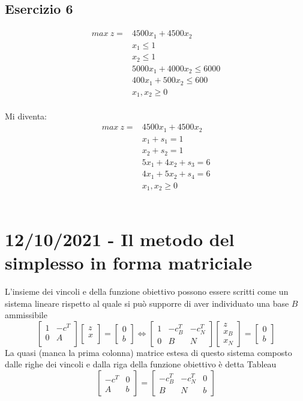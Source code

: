 \documentclass[12pt,a4paper]{article}
\begin{document}
 \subsection{Esercizio 6}
$$\begin{array}{cl}
max \ z = & 4500x_1+4500x_2\\
 & x_1 \leq 1\\
 & x_2 \leq 1\\
 & 5000x_1+4000x_2 \leq 6000\\
 & 400x_1+500x_2 \leq 600\\
 & x_1,x_2 \geq 0
 \end{array}$$\\
 Mi diventa: $$\begin{array}{cl}
max \ z = & 4500x_1+4500x_2\\
 & x_1 + s_1= 1\\
 & x_2 + s_2 = 1\\
 & 5x_1+4x_2 + s_3 = 6\\
 & 4x_1+5x_2 + s_4 = 6\\
 & x_1,x_2 \geq 0
 \end{array}$$\\
 
 \clearpage
 \section{12/10/2021 - Il metodo del simplesso in forma matriciale}
 L'insieme dei vincoli e della funzione obiettivo possono essere scritti come un sistema lineare rispetto al quale si può supporre di aver individuato una base $B$ ammissibile
 $$\left[\begin{array}{cc}1 & -c^T\\0 & A\\\end{array}\right]\left[\begin{array}{c}z\\x\\\end{array}\right] = \left[\begin{array}{c}0\\b\end{array}\right] \Leftrightarrow \left[\begin{array}{ccc}1&-c_B^T & -c_N^T\\0&B&N\end{array}\right]\left[\begin{array}{c}z\\x_B\\x_N\end{array}\right]=\left[\begin{array}{c}0\\b\end{array}\right]$$
 La quasi (manca la prima colonna) matrice estesa di questo sistema composto dalle righe dei vincoli e dalla riga della funzione obiettivo è detta Tableau
 $$\left[\begin{array}{cc}-c^T&0\\A&b\end{array}\right]=\left[\begin{array}{ccc}-c_B^T & -c_N^T & 0\\B&N&b\end{array}\right]$$
 
\end{document}
